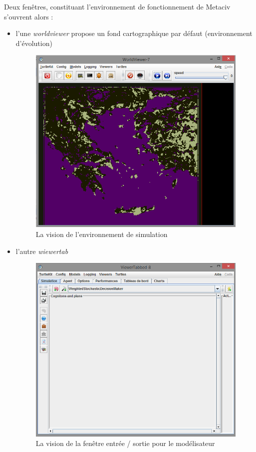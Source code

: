 \documentclass[a4paper,oneside,12 pt]{article}
\begin{document}

Deux fenêtres, constituant l'environnement de fonctionnement de Metaciv  s'ouvrent alors : 
\begin{itemize}
\item l'une \textit{worldviewer} propose un fond cartographique par défaut (environnement d'évolution)

\begin{figure}[hbtp]
\begin{center}
 \includegraphics [scale=0.5] {worldviewer.png}
\end{center}
 \caption{La vision de l'environnement de simulation}
\end{figure}
\newpage
\item l'autre \textit{wiewertab} 

\begin{figure}[hbtp]
\begin{center}
 \includegraphics [scale=0.5] {viewertabbed.png}
\end{center}
 \caption{La vision de la fenêtre entrée / sortie pour le modélisateur}
\end{figure}



\end{itemize}
\end{document}
